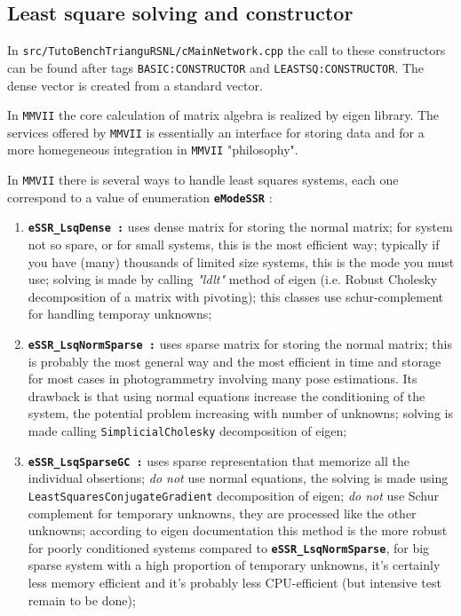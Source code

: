 \subsection{Least square solving and constructor}

In {\tt src/TutoBenchTrianguRSNL/cMainNetwork.cpp} the call to these constructors can be found
after tags {\tt  BASIC:CONSTRUCTOR} and {\tt LEASTSQ:CONSTRUCTOR}.
The dense vector is created from a standard vector.\UNCLEAR

In {\tt MMVII} the core calculation of matrix algebra is realized
by eigen library. The services offered by {\tt MMVII} is essentially
an interface for storing data and for a more homegeneous integration
in {\tt MMVII} "philosophy".

In {\tt MMVII} there is several ways to handle least squares systems, each
one correspond to a value of enumeration {\bf \tt eModeSSR} :

\begin{enumerate}

    \item{\bf \tt eSSR\_LsqDense :}
          uses dense matrix for storing the normal matrix; for system not so spare,
          or for small systems, this is the most efficient way; typically if you have
          (many) thousands of limited size systems, this is the mode you must use; solving
          is made by calling \emph{"ldlt"} method of eigen (i.e. Robust Cholesky 
          decomposition of a matrix with pivoting); this classes use schur-complement
          for handling temporay unknowns;

    \item {\bf \tt eSSR\_LsqNormSparse :}
          uses sparse matrix for storing the normal matrix; this is probably the most
          general way and the most efficient in time and storage for most cases in 
          photogrammetry involving many pose estimations. Its
          drawback is that using normal equations increase the conditioning of the
          system, the potential problem increasing with number of unknowns; 
          solving is made calling  {\tt SimplicialCholesky} decomposition of eigen;

    \item {\bf \tt eSSR\_LsqSparseGC :}
          uses sparse representation that memorize all the individual obsertions;
          \emph{do not} use normal equations, the solving is made using
          {\tt LeastSquaresConjugateGradient} decomposition of eigen;
          \emph{do not} use Schur complement for temporary unknowns, they
          are processed like the other unknowns; according to eigen documentation
          this method is the more robust for poorly conditioned systems
          compared to {\bf \tt eSSR\_LsqNormSparse}, for big
          sparse system with a high proportion of temporary unknowns, 
          it's certainly less memory  efficient and it's probably
          less CPU-efficient (but intensive test remain to be done);

\end{enumerate}

